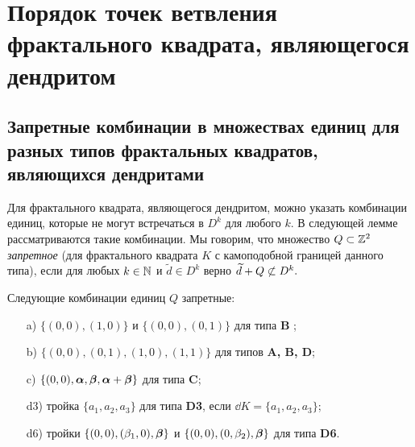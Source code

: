 

\section{Порядок точек ветвления фрактального квадрата, являющегося дендритом}

\subsection{Запретные комбинации в множествах единиц для разных типов фрактальных квадратов, являющихся дендритами}

Для фрактального квадрата, являющегося дендритом, можно указать комбинации единиц, которые не могут встречаться в $D^k$ для любого $k$. 
В следующей лемме рассматриваются такие комбинации. 
Мы говорим, что множество $Q\subset \mathbb{Z}^2$ {\em  запретное} (для фрактального квадрата $K$ с камоподобной границей данного типа), если для любых $k\in\mathbb{N}$ и $\widetilde d\in D^k$ верно
$\widetilde d+Q\not\subset D^k.$

\begin{lemma}\label{quadruples}
Следующие комбинации единиц $Q$ запретные:
\begin{itemize}[nolistsep]
\item[a)] $\{(0,0), (1,0)\} $ и $\{(0,0), (0,1)\} $ для типа {\bf B} ;
\item[b)] $\{(0,0), (0,1), (1,0), (1,1)\}$ для типов {\bf A, B, D};
\item[c)] $\{(0,0),{\bm{\alpha}},{\bm{\beta}},{\bm{\alpha}}+{\bm{\beta}}\}$ для типа {\bf C};
\item[d3)] тройка $\{a_1, a_2, a_3\}$ для типа {\bf D3}, если $\dd K=\{a_1,a_2, a_3\}$;
\item[d6)] тройки $\{(0,0),(\beta_1,0),{\bm{\beta}}\}$ и $\{(0,0),(0,\beta_2),{\bm{\beta}}\}$ для типа {\bf D6}. 
\end{itemize}
\end{lemma}

